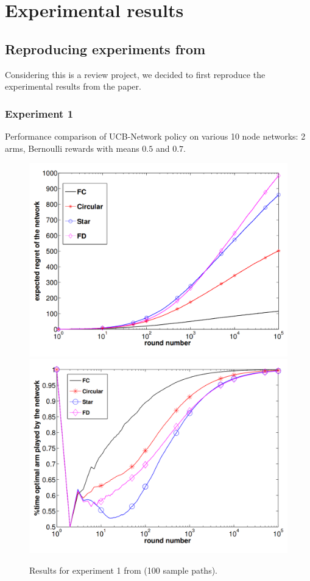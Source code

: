 \documentclass{article}
\begin{document}
\newpage

\section{Experimental results}

\subsection{Reproducing experiments from \cite{DBLP:journals/corr/KollaJG16}}

Considering this is a review project, we decided to first reproduce the experimental results from the paper.

\subsubsection{Experiment 1}

Performance comparison of UCB-Network policy on various 10 node networks: 2 arms, Bernoulli rewards with means $0.5$ and $0.7$.

\begin{figure}[H]
  \centering
  \includegraphics[width=0.49\linewidth]{fig1_1.png}
  \includegraphics[width=0.49\linewidth]{fig1_2.png}
  \caption{Results for experiment 1 from \cite{DBLP:journals/corr/KollaJG16} (100 sample paths).}
\end{figure}
\end{document}
